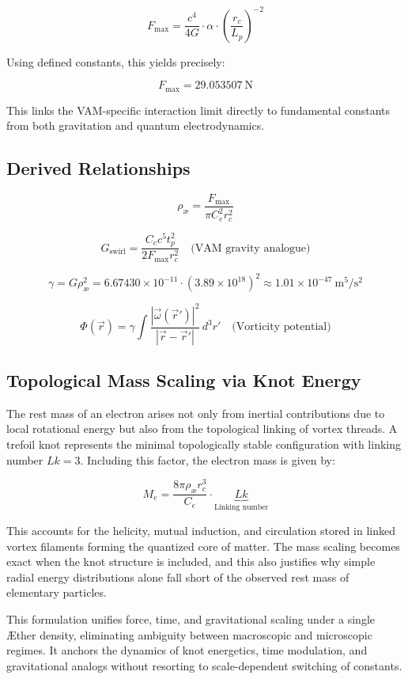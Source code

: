 \[
F_{\max} = \frac{c^4}{4G} \cdot \alpha \cdot \left( \frac{r_c}{L_p} \right)^{-2}
\]

Using defined constants, this yields precisely:

\[
F_{\max} = 29.053507~\text{N}
\]

This links the VAM-specific interaction limit directly to fundamental constants from both gravitation and quantum electrodynamics.





\subsection*{Derived Relationships}

\[
\rho_{\text{\ae}} = \frac{F_{\max}}{\pi C_e^2 r_c^2}
\]

\[
G_\text{swirl} = \frac{C_e c^5 t_p^2}{2 F_{\max} r_c^2} \quad \text{(VAM gravity analogue)}
\]

\[
\gamma = G \rho_{\text{\ae}}^2 = 6.67430 \times 10^{-11} \cdot (3.89 \times 10^{18})^2 \approx 1.01 \times 10^{-47}~\text{m}^5/\text{s}^2
\]

\[
\Phi(\vec{r}) = \gamma \int \frac{|\vec{\omega}(\vec{r}')|^2}{|\vec{r} - \vec{r}'|} \, d^3r' \quad \text{(Vorticity potential)}
\]

\subsection*{Topological Mass Scaling via Knot Energy}

The rest mass of an electron arises not only from inertial contributions due to local rotational energy but also from the topological linking of vortex threads. A trefoil knot represents the minimal topologically stable configuration with linking number \(Lk = 3\). Including this factor, the electron mass is given by:

\[
M_e = \boxed{ \frac{8\pi \rho_{\text{\ae}} r_c^3}{C_e} \cdot \underbrace{Lk}_{\text{Linking number}} }
\]

This accounts for the helicity, mutual induction, and circulation stored in linked vortex filaments forming the quantized core of matter. The mass scaling becomes exact when the knot structure is included, and this also justifies why simple radial energy distributions alone fall short of the observed rest mass of elementary particles.

This formulation unifies force, time, and gravitational scaling under a single Æther density, eliminating ambiguity between macroscopic and microscopic regimes. It anchors the dynamics of knot energetics, time modulation, and gravitational analogs without resorting to scale-dependent switching of constants.


